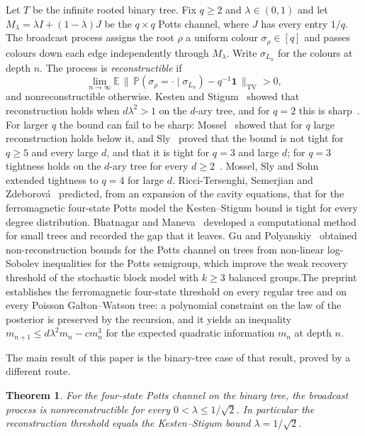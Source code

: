 \documentclass[11pt]{amsart}
\newtheorem{theorem}{Theorem}[section]
\theoremstyle{definition}
\theoremstyle{remark}
\newcommand{\E}{\mathbb{E}}
\newcommand{\one}{\mathbf{1}}
\begin{document}
Let $T$ be the infinite rooted binary tree. Fix $q\ge2$ and $\lambda\in(0,1)$ and let
$M_\lambda=\lambda I+(1-\lambda)J$ be the $q\times q$ Potts channel, where $J$ has every entry $1/q$.
The broadcast process assigns the root $\rho$ a uniform colour $\sigma_\rho\in[q]$ and passes colours
down each edge independently through $M_\lambda$. Write $\sigma_{L_n}$ for the colours at depth $n$.
The process is \emph{reconstructible} if
\[
\lim_{n\to\infty}\E\,\big\|\,\mathbb P(\sigma_\rho=\cdot\mid\sigma_{L_n})-q^{-1}\one\,\big\|_{\mathrm{TV}}>0,
\]
and nonreconstructible otherwise. Kesten and Stigum~\cite{KS66} showed that reconstruction holds when
$d\lambda^2>1$ on the $d$-ary tree, and for $q=2$ this is sharp~\cite{BRZ95,EKPS00}. For larger $q$ the
bound can fail to be sharp: Mossel~\cite{Mos01} showed that for $q$ large reconstruction holds below it,
and Sly~\cite{Sly11} proved that the bound is not tight for $q\ge5$ and every large $d$, and that it is
tight for $q=3$ and large $d$; for $q=3$ tightness holds on the $d$-ary tree for every $d\ge2$~\cite{Shm3}.
Mossel, Sly and Sohn~\cite{MSS22} extended tightness to $q=4$ for large $d$.
Ricci-Tersenghi, Semerjian and Zdeborov\'a~\cite{RSZ19} predicted, from an expansion of the cavity
equations, that for the ferromagnetic four-state Potts model the Kesten--Stigum bound is tight for every
degree distribution. Bhatnagar and Maneva~\cite{BM11} developed a computational method for small trees
and recorded the gap that it leaves. Gu and Polyanskiy~\cite{GP23} obtained non-reconstruction bounds for
the Potts channel on trees from non-linear log-Sobolev inequalities for the Potts semigroup, which improve the
weak recovery threshold of the stochastic block model with $k\ge3$ balanced groups.The preprint~\cite{OAI4} establishes the ferromagnetic four-state
threshold on every regular tree and on every Poisson Galton--Watson tree: a polynomial constraint on the
law of the posterior is preserved by the recursion, and it yields an inequality
$m_{n+1}\le d\lambda^2m_n-cm_n^3$ for the expected quadratic information $m_n$ at depth $n$.

The main result of this paper is the binary-tree case of that result, proved by a different route.

\begin{theorem}\label{thm:main}
For the four-state Potts channel on the binary tree, the broadcast process is nonreconstructible for
every $0<\lambda\le1/\sqrt2$. In particular the reconstruction threshold equals the Kesten--Stigum bound
$\lambda=1/\sqrt2$.
\end{theorem}
\end{document}
